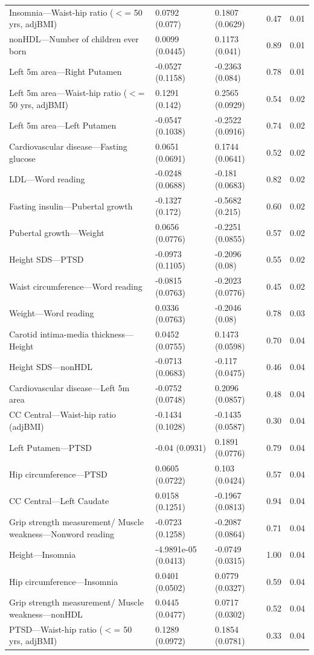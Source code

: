 \begin{table}[ht]
\begin{tabular}{lllrr}
  Insomnia---Waist-hip ratio ($<$= 50 yrs, adjBMI) & 0.0792 (0.077) & 0.1807 (0.0629) & 0.47 & 0.01 \\ 
  nonHDL---Number of children ever born & 0.0099 (0.0445) & 0.1173 (0.041) & 0.89 & 0.01 \\ 
  Left 5m area---Right Putamen & -0.0527 (0.1158) & -0.2363 (0.084) & 0.78 & 0.01 \\ 
  Left 5m area---Waist-hip ratio ($<$= 50 yrs, adjBMI) & 0.1291 (0.142) & 0.2565 (0.0929) & 0.54 & 0.02 \\ 
  Left 5m area---Left Putamen & -0.0547 (0.1038) & -0.2522 (0.0916) & 0.74 & 0.02 \\ 
  Cardiovascular disease---Fasting glucose & 0.0651 (0.0691) & 0.1744 (0.0641) & 0.52 & 0.02 \\ 
  LDL---Word reading & -0.0248 (0.0688) & -0.181 (0.0683) & 0.82 & 0.02 \\ 
  Fasting insulin---Pubertal growth & -0.1327 (0.172) & -0.5682 (0.215) & 0.60 & 0.02 \\ 
  Pubertal growth---Weight & 0.0656 (0.0776) & -0.2251 (0.0855) & 0.57 & 0.02 \\ 
  Height SDS---PTSD & -0.0973 (0.1105) & -0.2096 (0.08) & 0.55 & 0.02 \\ 
  Waist circumference---Word reading & -0.0815 (0.0763) & -0.2023 (0.0776) & 0.45 & 0.02 \\ 
  Weight---Word reading & 0.0336 (0.0763) & -0.2046 (0.08) & 0.78 & 0.03 \\ 
  Carotid intima-media thickness---Height & 0.0452 (0.0755) & 0.1473 (0.0598) & 0.70 & 0.04 \\ 
  Height SDS---nonHDL & -0.0713 (0.0683) & -0.117 (0.0475) & 0.46 & 0.04 \\ 
  Cardiovascular disease---Left 5m area & -0.0752 (0.0748) & 0.2096 (0.0857) & 0.48 & 0.04 \\ 
  CC Central---Waist-hip ratio (adjBMI) & -0.1434 (0.1028) & -0.1435 (0.0587) & 0.30 & 0.04 \\ 
  Left Putamen---PTSD & -0.04 (0.0931) & 0.1891 (0.0776) & 0.79 & 0.04 \\ 
  Hip circumference---PTSD & 0.0605 (0.0722) & 0.103 (0.0424) & 0.57 & 0.04 \\ 
  CC Central---Left Caudate & 0.0158 (0.1251) & -0.1967 (0.0813) & 0.94 & 0.04 \\ 
  Grip strength measurement/ Muscle weakness---Nonword reading & -0.0723 (0.1258) & -0.2087 (0.0864) & 0.71 & 0.04 \\ 
  Height---Insomnia & -4.9891e-05 (0.0413) & -0.0749 (0.0315) & 1.00 & 0.04 \\ 
  Hip circumference---Insomnia & 0.0401 (0.0502) & 0.0779 (0.0327) & 0.59 & 0.04 \\ 
  Grip strength measurement/ Muscle weakness---nonHDL & 0.0445 (0.0477) & 0.0717 (0.0302) & 0.52 & 0.04 \\ 
  PTSD---Waist-hip ratio ($<$= 50 yrs, adjBMI) & 0.1289 (0.0972) & 0.1854 (0.0781) & 0.33 & 0.04 \\ 
   \hline
\end{tabular}
\end{table}

